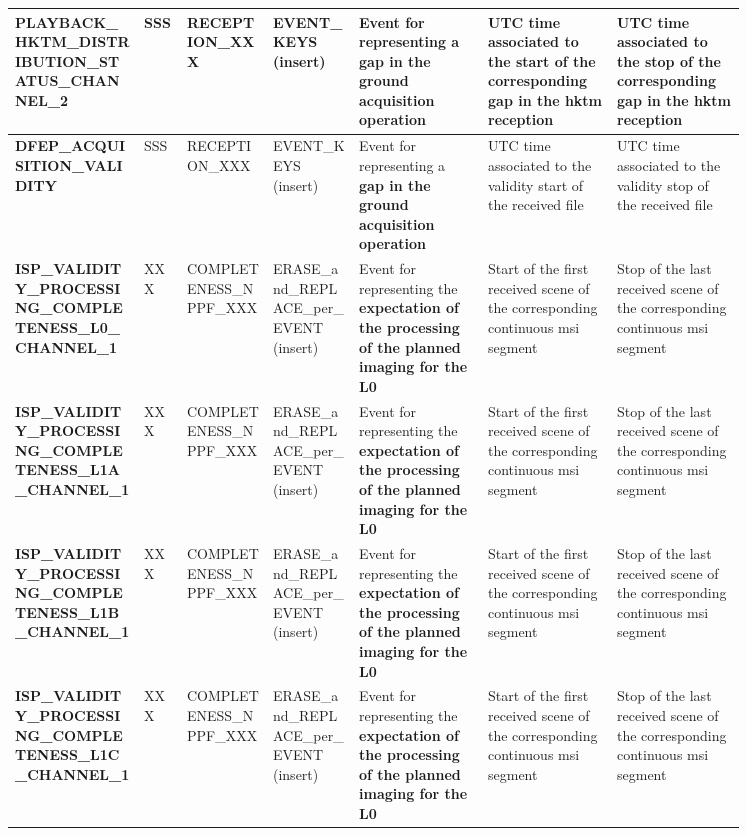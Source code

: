 \begin{landscape}
\begin{longtable}{|M{0.15\linewidth}|M{0.05\linewidth}|M{0.10\linewidth}|M{0.10\linewidth}|M{0.15\linewidth}|M{0.15\linewidth}|M{0.15\linewidth}|}
\textbf{PLAYBACK\_HKTM\_DISTRIBUTION\_STATUS\_CHANNEL\_2} & SSS & \- RECEPTION\_XXX & EVENT\_KEYS (insert) & Event for representing a \textbf{gap in the ground acquisition operation} & UTC time associated to the start of the corresponding gap in the \acrshort{hktm} reception & UTC time associated to the stop of the corresponding gap in the \acrshort{hktm} reception \\ \hline
\textbf{DFEP\_ACQUISITION\_VALIDITY} & SSS & \- RECEPTION\_XXX & EVENT\_KEYS (insert) & Event for representing a \textbf{gap in the ground acquisition operation} & UTC time associated to the validity start of the received file & UTC time associated to the validity stop of the received file \\ \hline
\textbf{ISP\_VALIDITY\_PROCESSING\_COMPLETENESS\_L0\_CHANNEL\_1} & XXX & \- COMPLETENESS\_NPPF\_XXX & ERASE\_and\_REPLACE\_per\_EVENT (insert) & Event for representing the \textbf{expectation of the processing of the planned imaging for the L0} & Start of the first received scene of the corresponding continuous \acrshort{msi} segment & Stop of the last received scene of the corresponding continuous \acrshort{msi} segment \\ \hline
\textbf{ISP\_VALIDITY\_PROCESSING\_COMPLETENESS\_L1A\_CHANNEL\_1} & XXX & \- COMPLETENESS\_NPPF\_XXX & ERASE\_and\_REPLACE\_per\_EVENT (insert) & Event for representing the \textbf{expectation of the processing of the planned imaging for the L0} & Start of the first received scene of the corresponding continuous \acrshort{msi} segment & Stop of the last received scene of the corresponding continuous \acrshort{msi} segment \\ \hline
\textbf{ISP\_VALIDITY\_PROCESSING\_COMPLETENESS\_L1B\_CHANNEL\_1} & XXX & \- COMPLETENESS\_NPPF\_XXX & ERASE\_and\_REPLACE\_per\_EVENT (insert) & Event for representing the \textbf{expectation of the processing of the planned imaging for the L0} & Start of the first received scene of the corresponding continuous \acrshort{msi} segment & Stop of the last received scene of the corresponding continuous \acrshort{msi} segment \\ \hline
\textbf{ISP\_VALIDITY\_PROCESSING\_COMPLETENESS\_L1C\_CHANNEL\_1} & XXX & \- COMPLETENESS\_NPPF\_XXX & ERASE\_and\_REPLACE\_per\_EVENT (insert) & Event for representing the \textbf{expectation of the processing of the planned imaging for the L0} & Start of the first received scene of the corresponding continuous \acrshort{msi} segment & Stop of the last received scene of the corresponding continuous \acrshort{msi} segment \\ \hline

\end{longtable}
\end{landscape}
